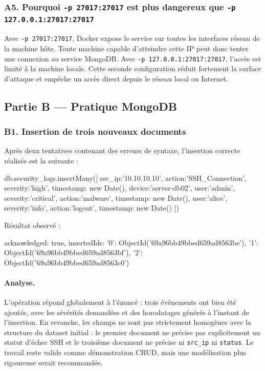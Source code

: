 \documentclass[11pt,a4paper]{article}
\begin{document}
\subsubsection*{A5. Pourquoi \texttt{-p 27017:27017} est plus dangereux que \texttt{-p 127.0.0.1:27017:27017}}

Avec \texttt{-p 27017:27017}, Docker expose le service sur toutes les interfaces réseau de la machine hôte. Toute machine capable d'atteindre cette IP peut donc tenter une connexion au service MongoDB. Avec \texttt{-p 127.0.0.1:27017:27017}, l'accès est limité à la machine locale. Cette seconde configuration réduit fortement la surface d'attaque et empêche un accès direct depuis le réseau local ou Internet.

\subsection{Partie B --- Pratique MongoDB}

\subsubsection*{B1. Insertion de trois nouveaux documents}

Après deux tentatives contenant des erreurs de syntaxe, l'insertion correcte réalisée est la suivante :

\begin{codeblock}
db.security_logs.insertMany([
  {src_ip:'10.10.10.10', action:'SSH_Connection', severity:'high', timestamp: new Date()},
  {device:'server-db02', user:'admin', severity:'critical', action:'malware', timestamp: new Date()},
  {user:'alice', severity:'info', action:'logout', timestamp: new Date()}
])
\end{codeblock}

Résultat observé :

\begin{codeblock}
{
  acknowledged: true,
  insertedIds: {
    '0': ObjectId('69a96bb49bbed659ad8563be'),
    '1': ObjectId('69a96bb49bbed659ad8563bf'),
    '2': ObjectId('69a96bb49bbed659ad8563c0')
  }
}
\end{codeblock}

\paragraph{Analyse.}
L'opération répond globalement à l'énoncé : trois événements ont bien été ajoutés, avec les sévérités demandées et des horodatages générés à l'instant de l'insertion. En revanche, les champs ne sont pas strictement homogènes avec la structure du dataset initial : le premier document ne précise pas explicitement un statut d'échec SSH et le troisième document ne précise ni \texttt{src\_ip} ni \texttt{status}. Le travail reste valide comme démonstration CRUD, mais une modélisation plus rigoureuse serait recommandée.
\end{document}
